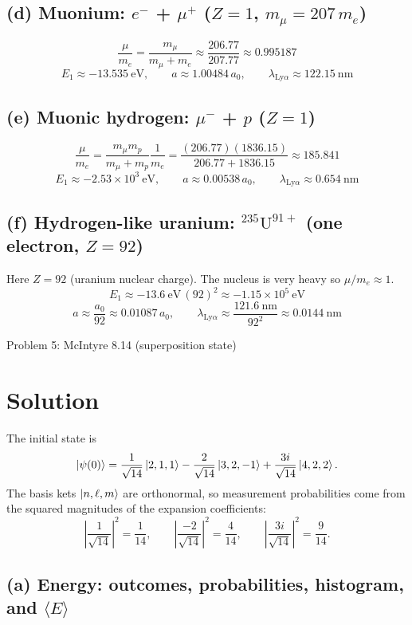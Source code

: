 \documentclass{article}
\begin{document}
\subsection*{(d) Muonium: $e^-$ + $\mu^+$ ($Z=1$, $m_\mu=207\,m_e$)}
\[
\frac{\mu}{m_e}=\frac{m_\mu}{m_\mu+m_e}\approx \frac{206.77}{207.77}\approx 0.995187
\]
\[
E_1\approx -13.535~\text{eV},\qquad
a\approx 1.00484\,a_0,\qquad
\lambda_{\mathrm{Ly}\alpha}\approx 122.15~\text{nm}
\]

\subsection*{(e) Muonic hydrogen: $\mu^-$ + $p$ ($Z=1$)}
\[
\frac{\mu}{m_e}=\frac{m_\mu m_p}{m_\mu+m_p}\frac{1}{m_e}
=\frac{(206.77)(1836.15)}{206.77+1836.15}\approx 185.841
\]
\[
E_1\approx -2.53\times 10^3~\text{eV},\qquad
a\approx 0.00538\,a_0,\qquad
\lambda_{\mathrm{Ly}\alpha}\approx 0.654~\text{nm}
\]

\subsection*{(f) Hydrogen-like uranium: ${}^{235}\mathrm{U}^{91+}$ (one electron, $Z=92$)}
Here $Z=92$ (uranium nuclear charge). The nucleus is very heavy so $\mu/m_e\approx 1$.
\[
E_1\approx -13.6~\text{eV}\,(92)^2 \approx -1.15\times 10^5~\text{eV}
\]
\[
a\approx \frac{a_0}{92}\approx 0.01087\,a_0,\qquad
\lambda_{\mathrm{Ly}\alpha}\approx \frac{121.6~\text{nm}}{92^2}\approx 0.0144~\text{nm}
\]

\newpage

{\huge Problem 5: McIntyre 8.14 (superposition state)}

\section*{Solution}

The initial state is
\[
\ket{\psi(0)}
=
\frac{1}{\sqrt{14}}\ket{2,1,1}
-\frac{2}{\sqrt{14}}\ket{3,2,-1}
+\frac{3i}{\sqrt{14}}\ket{4,2,2}.
\]
The basis kets $\ket{n,\ell,m}$ are orthonormal, so measurement probabilities come from
the squared magnitudes of the expansion coefficients:
\[
\left|\frac{1}{\sqrt{14}}\right|^2=\frac{1}{14},\qquad
\left|\frac{-2}{\sqrt{14}}\right|^2=\frac{4}{14},\qquad
\left|\frac{3i}{\sqrt{14}}\right|^2=\frac{9}{14}.
\]

\subsection*{(a) Energy: outcomes, probabilities, histogram, and $\langle E\rangle$}
\end{document}
